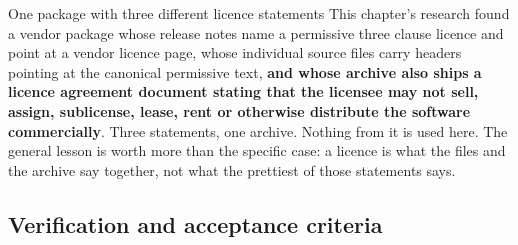 \begin{note}{One package with three different licence statements}
This chapter's research found a vendor package whose release notes name a
permissive three clause licence and point at a vendor licence page, whose
individual source files carry headers pointing at the canonical permissive text,
\textbf{and whose archive also ships a licence agreement document stating that
the licensee may not sell, assign, sublicense, lease, rent or otherwise
distribute the software commercially}. Three statements, one archive. Nothing
from it is used here. The general lesson is worth more than the specific case:
a licence is what the files and the archive say together, not what the
prettiest of those statements says.
\end{note}

\subsection*{Verification and acceptance criteria}


